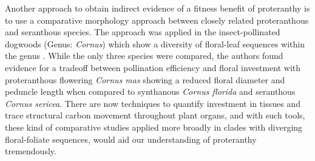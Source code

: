 \documentclass{article}\usepackage[]{graphicx}\usepackage[]{color}
\begin{document}
\par Another approach to obtain indirect evidence of a fitness benefit of proteranthy is to use a comparative morphology approach between closely related proteranthous and seranthous species. The approach was applied in the insect-pollinated dogwoods (Genus: \textit{Cornus}) which show a diversity of floral-leaf sequences within the genus \citep{Gunatilleke1984}. While the only three species were compared, the authors found evidence for a tradeoff between pollination efficiency and floral investment with proteranthous flowering \textit{Cornus mas} showing a reduced floral diameter and peduncle length when compared to synthanous \textit{Cornus florida} and seranthous \textit{Cornus sericea}. There are now techniques to quantify investment in tissues and trace structural carbon movement throughout plant organs, and with such tools, these kind of comparative studies applied more broadly in clades with diverging floral-foliate sequences, would aid our understanding of proteranthy tremendously.
\end{document}
